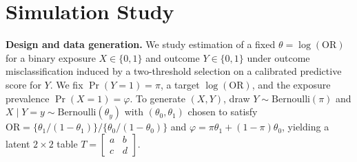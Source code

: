 \documentclass[lineno]{biometrika}
\begin{document}
\section{Simulation Study}

\textbf{Design and data generation.}
We study estimation of a fixed $\theta=\log(\mathrm{OR})$ for a binary exposure $X\in\{0,1\}$ and outcome $Y\in\{0,1\}$ under outcome misclassification induced by a two-threshold selection on a calibrated predictive score for $Y$. We fix $\Pr(Y{=}1)=\pi$, a target $\log(\mathrm{OR})$, and the exposure prevalence $\Pr(X{=}1)=\varphi$. To generate $(X,Y)$, draw $Y\sim\mathrm{Bernoulli}(\pi)$ and $X\mid Y{=}y\sim\mathrm{Bernoulli}(\theta_y)$ with $(\theta_0,\theta_1)$ chosen to satisfy $\mathrm{OR}=\{\theta_1/(1-\theta_1)\}/\{\theta_0/(1-\theta_0)\}$ and $\varphi=\pi\theta_1+(1-\pi)\theta_0$, yielding a latent $2\times2$ table $T=\begin{bmatrix}a&b\\ c&d\end{bmatrix}$.
\end{document}
